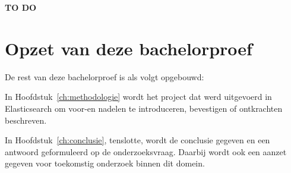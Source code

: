 \textbf{TO DO}

\section{Opzet van deze bachelorproef}
\label{sec:opzet-bachelorproef}


De rest van deze bachelorproef is als volgt opgebouwd:

In Hoofdstuk~\ref{ch:methodologie} wordt het project dat werd uitgevoerd in Elasticsearch om voor-en nadelen te introduceren, bevestigen of ontkrachten beschreven.

In Hoofdstuk~\ref{ch:conclusie}, tenslotte, wordt de conclusie gegeven en een antwoord geformuleerd op de onderzoeksvraag. Daarbij wordt ook een aanzet gegeven voor toekomstig onderzoek binnen dit domein.

